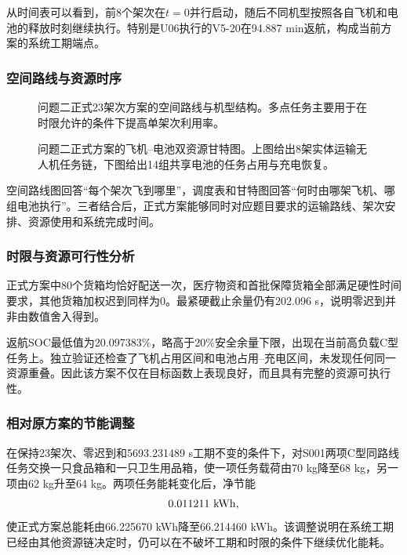 \documentclass[UTF8,a4paper,12pt]{ctexart}
\begin{document}
从时间表可以看到，前8个架次在$t=0$并行启动，随后不同机型按照各自飞机和电池的释放时刻继续执行。特别是U06执行的V5-20在94.887 min返航，构成当前方案的系统工期端点。

\subsubsection{空间路线与资源时序}

\begin{figure}[H]
  \centering
  \resizebox{0.84\textwidth}{!}{\QTwoFigRouteMap}
  \caption{问题二正式23架次方案的空间路线与机型结构。多点任务主要用于在时限允许的条件下提高单架次利用率。}
  \label{fig:q2_route_map_v7}
\end{figure}

\begin{figure}[H]
  \centering
  \resizebox{0.98\textwidth}{!}{\QTwoFigGantt}
  \caption{问题二正式方案的飞机--电池双资源甘特图。上图给出8架实体运输无人机任务链，下图给出14组共享电池的任务占用与充电恢复。}
  \label{fig:q2_gantt_v7}
\end{figure}

空间路线图回答“每个架次飞到哪里”，调度表和甘特图回答“何时由哪架飞机、哪组电池执行”。三者结合后，正式方案能够同时对应题目要求的运输路线、架次安排、资源使用和系统完成时间。

\subsubsection{时限与资源可行性分析}

正式方案中80个货箱均恰好配送一次，医疗物资和首批保障货箱全部满足硬性时间要求，其他货箱加权迟到同样为0。最紧硬截止余量仍有202.096 s，说明零迟到并非由数值舍入得到。

返航SOC最低值为20.097383\%，略高于20\%安全余量下限，出现在当前高负载C型任务上。独立验证还检查了飞机占用区间和电池占用--充电区间，未发现任何同一资源重叠。因此该方案不仅在目标函数上表现良好，而且具有完整的资源可执行性。

\subsubsection{相对原方案的节能调整}

在保持23架次、零迟到和5693.231489 s工期不变的条件下，对S001两项C型同路线任务交换一只食品箱和一只卫生用品箱，使一项任务载荷由70 kg降至68 kg，另一项由62 kg升至64 kg。两项任务能耗变化后，净节能
\[
0.011211\ {\rm kWh},
\]
使正式方案总能耗由66.225670 kWh降至66.214460 kWh。该调整说明在系统工期已经由其他资源链决定时，仍可以在不破坏工期和时限的条件下继续优化能耗。
\end{document}
